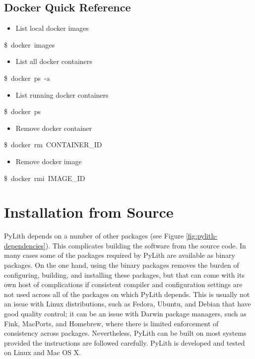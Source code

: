 \subsection{Docker Quick Reference}
\begin{itemize}
\item List local docker images\end{itemize}
\begin{lyxcode}
\$~docker~images\end{lyxcode}
\begin{itemize}
\item List all docker containers\end{itemize}
\begin{lyxcode}
\$~docker~ps~-a\end{lyxcode}
\begin{itemize}
\item List running docker containers\end{itemize}
\begin{lyxcode}
\$~docker~ps\end{lyxcode}
\begin{itemize}
\item Remove docker container\end{itemize}
\begin{lyxcode}
\$~docker~rm~CONTAINER\_ID\end{lyxcode}
\begin{itemize}
\item Remove docker image\end{itemize}
\begin{lyxcode}
\$~docker~rmi~IMAGE\_ID
\end{lyxcode}

\section{Installation from Source}

PyLith depends on a number of other packages (see Figure \ref{fig:pylith-dependencies}).
This complicates building the software from the source code. In many
cases some of the packages required by PyLith are available as binary
packages. On the one hand, using the binary packages removes the burden
of configuring, building, and installing these packages, but that
can come with its own host of complications if consistent compiler
and configuration settings are not used across all of the packages
on which PyLith depends. This is usually not an issue with Linux distributions,
such as Fedora, Ubuntu, and Debian that have good quality control;
it can be an issue with Darwin package managers, such as Fink, MacPorts,
and Homebrew, where there is limited enforcement of consistency across
packages. Nevertheless, PyLith can be built on most systems provided
the instructions are followed carefully. PyLith is developed and tested
on Linux and Mac OS X.

